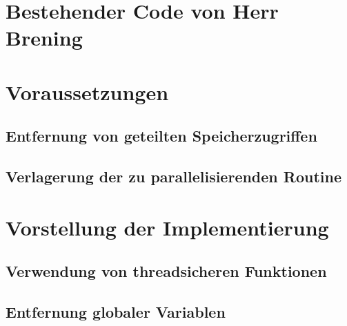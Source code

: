 \section{Bestehender Code von Herr Brening}
\label{sec:Bestehender_Code_Brening}

\section{Voraussetzungen}
\label{sec:Voraussetzungen_Parallelisierung}

\subsection{Entfernung von geteilten Speicherzugriffen}
\label{sec:Entfernung_geteilte_Speicherzugriffe}

\subsection{Verlagerung der zu parallelisierenden Routine}
\label{sec:Verlagerung_parallelisierende_Routine}

\section{Vorstellung der Implementierung}
\label{sec:Vorstellung_Implementierung}

\subsection{Verwendung von threadsicheren Funktionen}
\label{sec:Verwendung_threadsichere_Funktionen}

\subsection{Entfernung globaler Variablen}
\label{sec:Entfernung_globaler_Variablen}